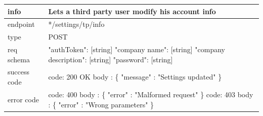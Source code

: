 \documentclass[titlepage]{article}
\begin{document}
\vspace{\baselineskip}

\begin{tabularx}{\textwidth}{lX} \hline
    info & Lets a third party user modify his account info \\ \hline
    endpoint & */settings/tp/info \\ \hline
    type & POST \\ \hline
    req schema & 
    "authToken": [string] \newline
    "company name": [string] \newline
    "company description": [string] \newline
    "password": [string] \\ \hline
    success code &
        code: 200 OK \newline \newline 
        body : \{ \newline
        "message" : "Settings updated" \newline
        \} \\ \hline
    error code &
        code: 400 \newline
        body : \{ "error" : "Malformed request" \} \newline \newline
        code: 403 \newline
        body : \{ "error" : "Wrong parameters" \} 
\end{tabularx}
		
\vspace{\baselineskip}
\end{document}
